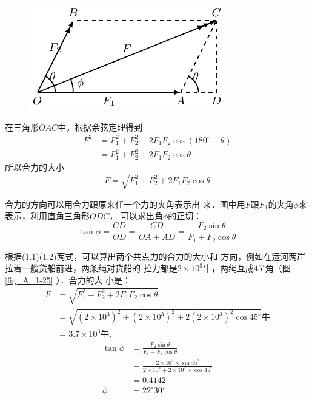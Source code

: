 \begin{figure} [htp]
\centering
\includegraphics{fig/A/1-24.pdf} 
\caption{} \label{fig_A_1-24} 
\end{figure} 


    在三角形$OAC$中，根据余弦定理得到
\[\begin{split} 
F^2 & = F_1^2+F_2^2-2F_1F_2\cos(180^\circ -\theta)  \\
&= F_1^2+F_2^2+2F_1F_2\cos\theta
\end{split}  \]
所以合力的大小
\begin{equation} 
F=\sqrt{F_1^2+F_2^2+2F_1F_2\cos\theta} 
\end{equation} 

    合力的方向可以用合力跟原来任一个力的夹角表示出
来．图中用$F$跟$F_1$的夹角$\phi$来表示，利用直角三角形$ODC$，
可以求出角$\phi$的正切：
\begin{equation} 
\tan\phi =\frac{CD} {OD} =\frac{CD} {OA+AD} =\frac{F_2\sin\theta } {F_1+F_2\cos\theta} 
\end{equation} 




    根据(1.1)(1.2)两式，可以算出两个共点力的合力的大小和
方向，例如在运河两岸拉着一艘货船前进，两条绳对货船的
拉力都是$2\times 10^3$牛，两绳互成$45^\circ$角（图 \ref{fig_A_1-25} ）．合力的大
小是：
\[\begin{split} 
F&= \sqrt{F_1^2+F_2^2+2F_1F_2\cos\theta} \\
&=\sqrt{(2\times 10^3)^2+(2\times 10^3)^2+2(2\times 10^3)^2\cos 45^{\circ} } \text{牛} \\
&=3.7\times 10^3\text{牛.} 
\end{split}  \]
\[\begin{split} 
\tan\phi&= \frac{F_2\sin\theta } {F_1+F_2\cos\theta} \\
&= \frac{2\times 10^3\times \sin 45^{\circ} } {2\times 10^3+2\times 10^3\times \cos 45^{\circ} }   \\
&=0.4142\\
\phi &= 22^{\circ}  30'
\end{split}  \]

